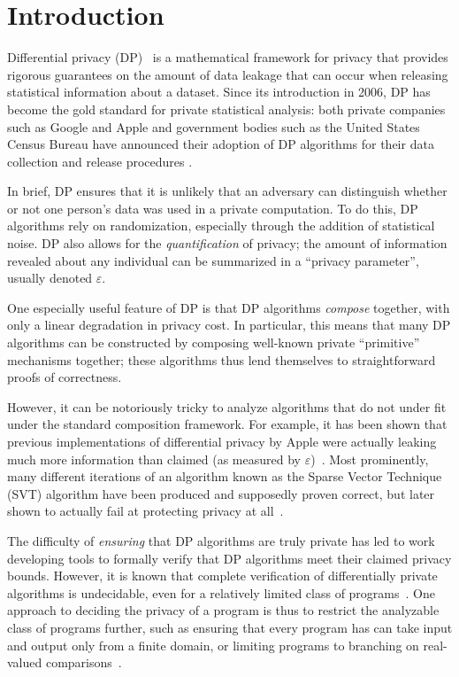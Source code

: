 
\section{Introduction}

Differential privacy (DP)~\cite{dworkCalibratingNoiseSensitivity2006a,dworkAlgorithmicFoundationsDifferential2014b} is a mathematical framework for privacy that provides rigorous guarantees on the amount of data leakage that can occur when releasing statistical information about a dataset. Since its introduction in 2006, DP has become the gold standard for private statistical analysis:
both private companies such as Google and Apple and government bodies such as the United States Census Bureau have announced their adoption of DP algorithms for their data collection and release procedures \cite{HowWeRe,PrivacyFeaturesa,LearningPrivacyScalea,abowdCensusBureauAdopts2018a}. 

In brief, DP ensures that it is unlikely that an adversary can distinguish whether or not one person's data was used in a private computation. To do this, DP algorithms rely on randomization, especially through the addition of statistical noise. DP also allows for the \textit{quantification} of privacy; the amount of information revealed about any individual can be summarized in a ``privacy parameter'', usually denoted $\varepsilon$. 

One especially useful feature of DP is that DP algorithms \textit{compose} together, with only a linear degradation in privacy cost. In particular, this means that many DP algorithms can be constructed by composing well-known private ``primitive'' mechanisms together; these algorithms thus lend themselves to straightforward proofs of correctness. 

However, it can be notoriously tricky to analyze algorithms that do not under fit under the standard composition framework. For example, it has been shown that previous implementations of differential privacy by Apple were actually leaking much more information than claimed (as measured by $\varepsilon$)~\cite{tangPrivacyLossApple2017,gadottiPoolInferenceAttacks2022}. 
Most prominently, many different iterations of an algorithm known as the Sparse Vector Technique (SVT) algorithm have been produced and supposedly proven correct, but later shown to actually fail at protecting privacy at all~\cite{lyuUnderstandingSparseVector2016a}. 

The difficulty of \textit{ensuring} that DP algorithms are truly private has led to work developing tools to formally verify that DP algorithms meet their claimed privacy bounds. However, it is known that complete verification of differentially private algorithms is undecidable, even for a relatively limited class of programs~\cite{bartheDecidingDifferentialPrivacy2020}.
One approach to deciding the privacy of a program is thus to restrict the analyzable class of programs further, such as ensuring that every program has can take input and output only from a finite domain, or limiting programs to branching on real-valued comparisons~\cite{bartheDecidingDifferentialPrivacy2020,chadhaLinearTimeDecidability2021,chadhaDecidingDifferentialPrivacy2023}.

